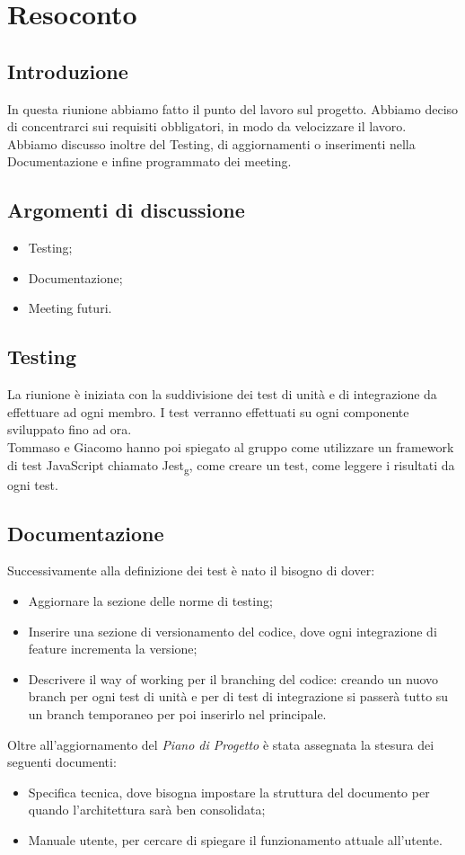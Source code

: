 \section{Resoconto}
\subsection{Introduzione}
In questa riunione abbiamo fatto il punto del lavoro sul progetto.
Abbiamo deciso di concentrarci sui requisiti obbligatori, in modo da velocizzare il lavoro.
Abbiamo discusso inoltre del Testing, di aggiornamenti o inserimenti nella Documentazione e infine programmato dei meeting.
\subsection{Argomenti di discussione}
\begin{itemize}
    \item Testing;
    \item Documentazione;
    \item Meeting futuri.
\end{itemize}
\subsection{Testing}
La riunione è iniziata con la suddivisione dei test di unità e di integrazione da effettuare ad ogni membro. I test verranno effettuati su ogni componente sviluppato fino ad ora.\\
Tommaso e Giacomo hanno poi spiegato al gruppo come utilizzare un framework di test JavaScript chiamato Jest\textsubscript{g}, come creare un test, come leggere i risultati da ogni test.
\subsection{Documentazione}
Successivamente alla definizione dei test è nato il bisogno di dover: 
\begin{itemize}
	\item Aggiornare la sezione delle norme di testing;
	\item Inserire una sezione di versionamento del codice, dove ogni integrazione di feature incrementa la versione;
	\item Descrivere il way of working per il branching del codice: creando un nuovo branch per ogni test di unità e per di test di integrazione si passerà tutto su un branch temporaneo per poi inserirlo nel principale.
\end{itemize}
Oltre all'aggiornamento del \textit{Piano di Progetto} è stata assegnata la stesura dei seguenti documenti:
\begin{itemize}
	\item Specifica tecnica, dove bisogna impostare la struttura del documento per quando l’architettura sarà ben consolidata;
	\item Manuale utente, per cercare di spiegare il funzionamento attuale all'utente. 
\end{itemize}

